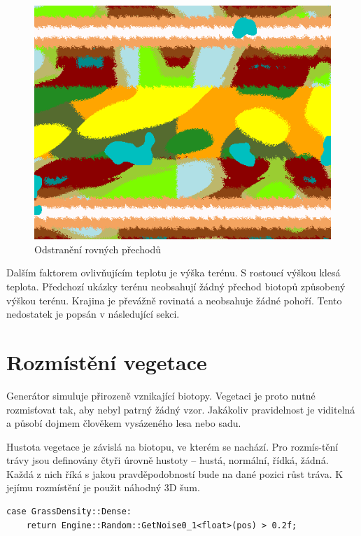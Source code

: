 \documentclass[thesis=M,czech]{FITthesis}[2019/12/23]
\begin{document}
\begin{figure}\centering
	\includegraphics[width=\textwidth]{images/world_gen/biomes_new}
	\caption[Odstranění rovných přechodů]{Odstranění rovných přechodů}\label{fig:biomes_new}
\end{figure}

Dalším faktorem ovlivňujícím teplotu je výška terénu. S rostoucí výškou klesá teplota. Předchozí ukázky terénu neobsahují žádný přechod biotopů způsobený výškou terénu. Krajina je převážně rovinatá a neobsahuje žádné pohoří. Tento nedostatek je popsán v následující sekci.

\section{Rozmístění vegetace}

Generátor simuluje přirozeně vznikající biotopy. Vegetaci je proto nutné rozmisťovat tak, aby nebyl patrný žádný vzor. Jakákoliv pravidelnost je viditelná a působí dojmem člověkem vysázeného lesa nebo sadu.

Hustota vegetace je závislá na biotopu, ve kterém se nachází. Pro rozmís-tění trávy jsou definovány čtyři úrovně hustoty -- hustá, normální, řídká, žádná. Každá z nich říká s jakou pravděpodobností bude na dané pozici růst tráva. K jejímu rozmístění je použit náhodný 3D šum.

\begin{verbatim}
case GrassDensity::Dense:
    return Engine::Random::GetNoise0_1<float>(pos) > 0.2f;
\end{verbatim}
\end{document}
